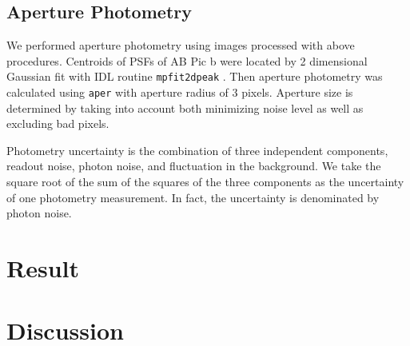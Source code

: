 \documentclass[apj]{emulateapj}
\begin{document}
\subsection{Aperture Photometry}

We performed aperture photometry using images processed with above
procedures.  Centroids of PSFs of AB Pic b were located by 2 dimensional
Gaussian fit with IDL routine \texttt{mpfit2dpeak}
\citep{Markwardt2009}. Then aperture photometry was calculated using
\texttt{aper} with aperture radius of 3 pixels. Aperture size is
determined by taking into account both minimizing noise level as well as
excluding bad pixels.

Photometry uncertainty is the combination of three independent components, readout
noise, photon noise, and fluctuation in the background. We take the
square root of the sum of the squares of the three components as the
uncertainty of one photometry measurement. In fact, the uncertainty is
denominated by photon noise.
\section{Result}
\section{Discussion}

\end{document}
